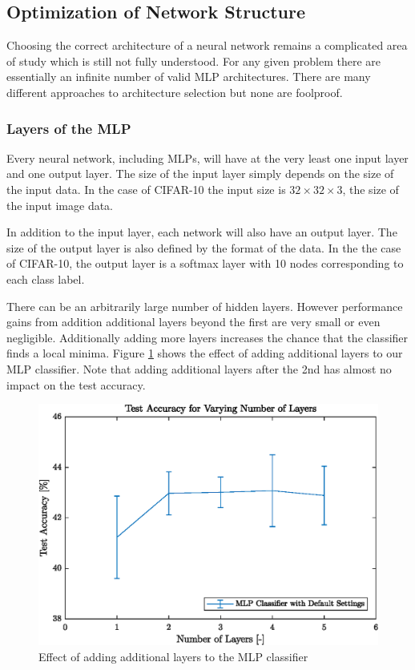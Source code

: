 \subsection{Optimization of Network Structure}\label{subsec:netStruct}

Choosing the correct architecture of a neural network remains a complicated area of study which is still not fully understood\cite{andersen1999cross}. For any given problem there are essentially an infinite number of valid MLP architectures. There are many different approaches to architecture selection but none are foolproof\cite{andersen1999cross}.

\subsubsection{Layers of the MLP}

Every neural network, including MLPs, will have at the very least one input layer and one output layer. The size of the input layer simply depends on the size of the input data. In the case of CIFAR-10 the input size is $32\times32\times3$, the size of the input image data.

In addition to the input layer, each network will also have an output layer. The size of the output layer is also defined by the format of the data. In the the case of CIFAR-10, the output layer is a softmax layer with 10 nodes corresponding to each class label.

There can be an arbitrarily large number of hidden layers. However performance gains from addition additional layers beyond the first are very small or even negligible. Additionally adding more layers increases the chance that the classifier finds a local minima\cite{de1993backpropagation}. Figure \ref{fig:layers} shows the effect of adding additional layers to our MLP classifier. Note that adding additional layers after the 2nd has almost no impact on the test accuracy.

\begin{figure}[h!]
    \centering
    \includegraphics{images/numberlayers}
    \caption{Effect of adding additional layers to the MLP classifier}
    \label{fig:layers}
 \end{figure}


